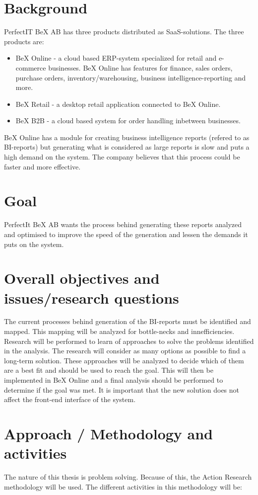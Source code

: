 \documentclass[12pt,a4paper]{article}
\begin{document}
\section*{Background}
PerfectIT BeX AB has three products distributed as SaaS-solutions. The three products are:
\begin{itemize}
\item BeX Online - a cloud based ERP-system specialized for retail and e-commerce businesses. BeX Online has features for finance, sales orders, purchase orders, inventory/warehousing, business intelligence-reporting and more. 
\item BeX Retail - a desktop retail application connected to BeX Online.
\item BeX B2B - a cloud based system for order handling inbetween businesses.
\end{itemize}

BeX Online has a module for creating business intelligence reports (refered to as BI-reports) but generating what is considered as large reports is slow and puts a high demand on the system. The company believes that this process could be faster and more effective. 


\section*{Goal}
PerfectIt BeX AB wants the process behind generating these reports analyzed and optimised to improve the speed of the generation and lessen the demands it puts on the system.

\section*{Overall objectives and issues/research questions}
The current processes behind generation of the BI-reports must be identified and mapped. This mapping will be analyzed for bottle-necks and innefficiencies. Research will be performed to learn of approaches to solve the problems identified in the analysis. The research will consider as many options as possible to find a long-term solution.
These approaches will be analyzed to decide which of them are a best fit and should be used to reach the goal. This will then be implemented in BeX Online and a final analysis should be performed to determine if the goal was met.
It is important that the new solution does not affect the front-end interface of the system.

\section*{Approach / Methodology and activities}
The nature of this thesis is problem solving. Because of this, the Action Research methodology will be used. The different activities in this methodology will be:
\end{document}
